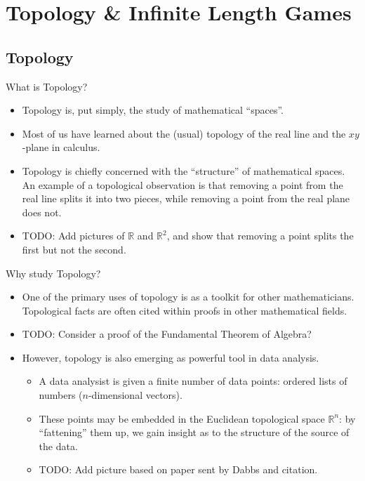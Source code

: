 \documentclass{beamer}
\begin{document}
\section{Topology \& Infinite Length Games}

\subsection{Topology}

\begin{frame}{What is Topology?}

  \begin{itemize}
  \item
    Topology is, put simply, the study of mathematical ``spaces''.
  \pause
  \item
    Most of us have learned about the (usual) topology of the real line and the $xy$-plane in calculus.
  \pause
  \item
    Topology is chiefly concerned with the ``structure'' of mathematical spaces. An example of a topological observation is that removing a point from the real line splits it into two pieces, while removing a point from the real plane does not.
  \pause
  \item
    TODO: Add pictures of $\mathbb{R}$ and $\mathbb{R}^2$, and show that removing a point splits the first but not the second.
  \end{itemize}

\end{frame}

\begin{frame}{Why study Topology?}
  \begin{itemize}
    \item 
      One of the primary uses of topology is as a toolkit for other mathematicians. Topological facts are often cited within proofs in other mathematical fields.
    \pause
    \item TODO: Consider a proof of the Fundamental Theorem of Algebra?
    \pause
    \item
      However, topology is also emerging as powerful tool in data analysis.
      \pause
      \begin{itemize}
        \item A data analysist is given a finite number of data points: ordered lists of numbers ($n$-dimensional vectors).
        \pause
        \item These points may be embedded in the Euclidean topological space $\mathbb{R}^n$: by ``fattening'' them up, we gain insight as to the structure of the source of the data.
        \pause
        \item TODO: Add picture based on paper sent by Dabbs and citation.
      \end{itemize}
  \end{itemize}
\end{frame}
\end{document}
